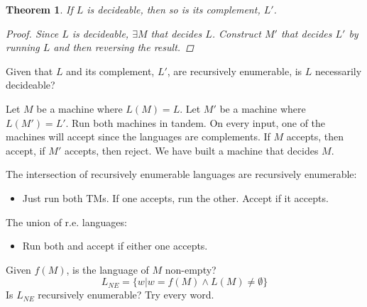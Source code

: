 \documentclass[12pt]{article}
\newtheorem{thm}{Theorem}
\theoremstyle{definition}
\begin{document}
\begin{thm}
	If $L$ is decideable, then so is its complement, $L'$.
	\begin{proof}
		Since $L$ is decideable, $\exists M$ that decides $L$. Construct $M'$
		that decides $L'$ by running $L$ and then reversing the result.
	\end{proof}
\end{thm}

Given that $L$ and its complement, $L'$, are recursively enumerable, is $L$
necessarily decideable?

Let $M$ be a machine where $L(M) = L$.
Let $M'$ be a machine where $L(M') = L'$.
Run both machines in tandem. On every input, one of the machines will accept
since the languages are complements. If $M$ accepts, then accept, if $M'$
accepts, then reject. We have built a machine that decides $M$.

The intersection of recursively enumerable languages are recursively enumerable:
\begin{itemize}
	\item Just run both TMs. If one accepts, run the other. Accept if it
		accepts.
\end{itemize}
The union of r.e. languages:
\begin{itemize}
	\item Run both and accept if either one accepts.
\end{itemize}

Given $f(M)$, is the language of $M$ non-empty?
\begin{equation}
	L_{NE} = \{w | w = f(M) \land L(M) \neq \emptyset\}
\end{equation}
Is $L_{NE}$ recursively enumerable? Try every word.
\end{document}
